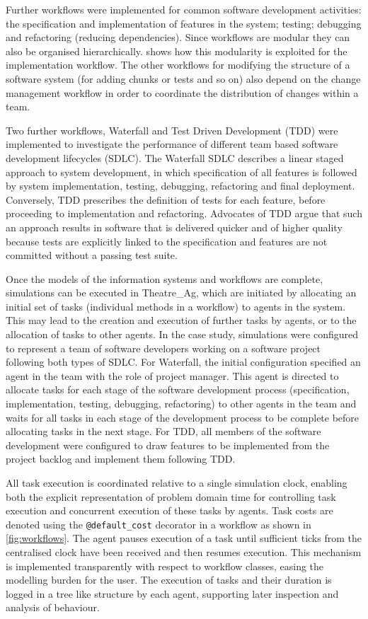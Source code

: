 \documentclass{llncs}
\begin{document}
Further workflows were implemented for common software development activities: the specification and implementation of
features in the system; testing; debugging and refactoring (reducing dependencies).  Since workflows are modular they
can also be organised hierarchically.   shows how this modularity is exploited for the
implementation workflow. The other workflows for modifying the structure of a software system (for adding
chunks or tests and so on) also depend on the change management workflow in order to coordinate the distribution of changes
within a team.

Two further workflows, Waterfall and Test Driven Development (TDD) were implemented to investigate the performance of
different team based software development lifecycles (SDLC).  The Waterfall SDLC \citep{benington83production} describes
a linear staged approach to system development, in which specification of all features is followed by system
implementation, testing, debugging, refactoring and final deployment.  Conversely, TDD \citep{beck02test} prescribes the
definition of tests for each feature, before proceeding to implementation and refactoring.  Advocates of TDD argue that
such an approach results in software that is delivered quicker and of higher quality because tests are explicitly linked
to the specification and features are not committed without a passing test suite.

Once the models of the information systems and workflows are complete, simulations can be executed in Theatre\_Ag, which
are initiated by allocating an initial set of tasks (individual methods in a workflow) to agents in the system. This may
lead to the creation and execution of further tasks by agents, or to the allocation of tasks to other agents.  In the
case study, simulations were configured to represent a team of software developers working on a software project
following both types of SDLC.  For Waterfall, the initial configuration specified an agent in the team with the role of
project manager.  This agent is directed to allocate tasks for each stage of the software development process
(specification, implementation, testing, debugging, refactoring) to other agents in the team and waits for all tasks in
each stage of the development process to be complete before allocating tasks in the next stage.  For TDD, all members of
the software development were configured to draw features to be implemented from the project backlog and implement them
following TDD.

All task execution is coordinated relative to a single simulation clock, enabling both the explicit representation of
problem domain time for controlling task execution and concurrent execution of these tasks by agents.  Task costs are
denoted using the \lstinline!@default_cost! decorator in a workflow as shown in \cref{fig:workflows}.  The agent
pauses execution of a task until sufficient ticks from the centralised clock have been received and then resumes execution.
This mechanism is implemented transparently with respect to workflow classes, easing the modelling burden for the user.
The execution of tasks and their duration is logged in a tree like structure by each agent, supporting later inspection
and analysis of behaviour.
\end{document}
